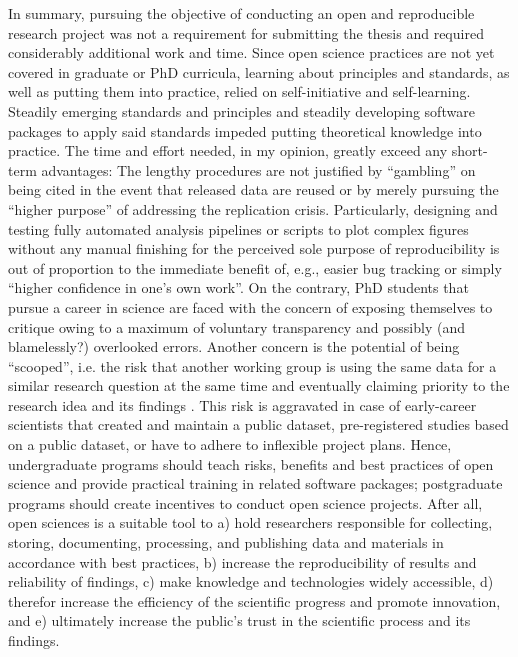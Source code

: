 %
In summary, pursuing the objective of conducting an open and reproducible
research project was not a requirement for submitting the thesis and required
considerably additional work and time.
%
Since open science practices are not yet covered in graduate or PhD curricula,
learning about principles and standards, as well as putting them into practice,
relied on self-initiative and self-learning.
%
Steadily emerging standards and principles and steadily developing software
packages to apply said standards impeded putting theoretical knowledge into
practice.
%
The time and effort needed, in my opinion, greatly exceed any short-term
advantages:
%
The lengthy procedures are not justified by ``gambling'' on being cited in the
event that released data are reused or by merely pursuing the ``higher purpose''
of addressing the replication crisis.
%
Particularly, designing and testing fully automated analysis pipelines or
scripts to plot complex figures without any manual finishing for the perceived
sole purpose of reproducibility is out of proportion to the immediate benefit
of, e.g., easier bug tracking or simply ``higher confidence in one's own work''.
%
On the contrary, PhD students that pursue a career in science are faced with the
concern of exposing themselves to critique owing to a maximum of voluntary
transparency and possibly (and blamelessly?) overlooked errors.
%
Another concern is the potential of being ``scooped'', i.e. the risk that
another working group is using the same data for a similar research question at
the same time and eventually claiming priority to the research idea and its
findings \citep[cf.][]{laine2017afraid}.
%
This risk is aggravated in case of early-career scientists that created and
maintain a public dataset, pre-registered studies based on a public dataset, or
have to adhere to inflexible project plans.
%
Hence, undergraduate programs should teach risks, benefits and best practices of
open science and provide practical training in related software packages;
%
postgraduate programs should create incentives to conduct open science projects.
%
After all, open sciences is a suitable tool to
%
a) hold researchers responsible for collecting, storing, documenting,
processing, and publishing data and materials in accordance with best practices,
%
b) increase the reproducibility of results and reliability of findings,
%
c) make knowledge and technologies widely accessible,
%
d) therefor increase the efficiency of the scientific progress and promote
innovation, and
%
e) ultimately increase the public's trust in the scientific process and its
findings.

